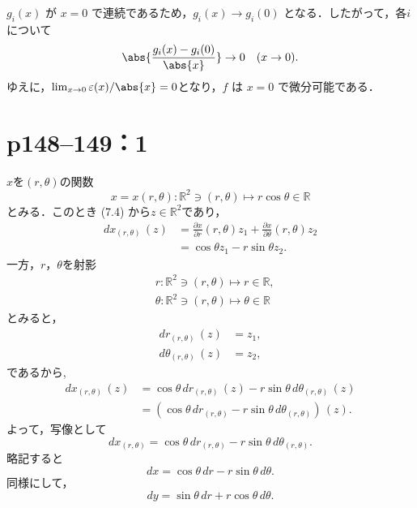 \begin{tproof}
\begin{description}
          $ g_i(x) $ が $ x=0 $ で連続であるため，$ g_i(x) \to g_i(0) $ となる．したがって，各$ i $について
          \[
            \abs{ \frac{g_i(x) - g_i(0)}{\abs{x}} } \to 0 \quad (x \to 0).
          \]
          ゆえに，$\lim_{x \to 0} \varepsilon(x)/\abs{x} = 0$となり，$ f $ は $ x=0 $ で微分可能である．
  \end{description}
\end{tproof}

\section*{p148--149：1} \label{p148--149：1}

\begin{tanswer}
  $x$を$(r,\theta)$の関数
  \[
    x = x(r,\theta) \colon \mathbb{R}^2 \ni (r,\theta) \mapsto r \cos \theta \in\mathbb{R}
  \]
  とみる．このとき (7.4) から$ z\in \mathbb{R}^2$であり，
  \begin{align*}
    dx_{(r,\theta)} \, (z) & = \frac{\partial x}{\partial r} (r,\theta) z_1 + \frac{\partial x}{\partial \theta} (r,\theta) z_2 \\
                           & = \cos \theta z_1 - r \sin \theta z_2.
  \end{align*}
  一方，$r$，$\theta$を射影
  \begin{align*}
     & r \colon \mathbb{R}^2 \ni (r,\theta) \mapsto r \in \mathbb{R} ,         \\
     & \theta \colon \mathbb{R}^2 \ni (r,\theta) \mapsto \theta \in \mathbb{R}
  \end{align*}
  とみると，
  \begin{align*}
    dr_{(r,\theta)} \, (z)      & = z_1, \\
    d\theta_{(r,\theta)} \, (z) & = z_2,
  \end{align*}
  であるから,
  \begin{align*}
    dx_{(r,\theta)} \, (z) & = \cos \theta \, d r_{(r,\theta)} \, (z) - r \sin \theta \, d \theta_{(r,\theta)} \, (z) \\
                           & = (\cos \theta \, d r_{(r,\theta)} - r \sin \theta \, d \theta_{(r,\theta)}) \, (z).
  \end{align*}
  よって，写像として
  \[
    dx_{(r,\theta)} = \cos \theta \,dr_{(r,\theta)} - r \sin \theta \,d \theta_{(r,\theta)}.
  \]
  略記すると
  \[
    dx = \cos \theta \,dr - r \sin \theta \,d \theta.
  \]
  同様にして，
  \[
    dy = \sin \theta \,dr + r \cos \theta \,d \theta.
\]
\end{tanswer}
